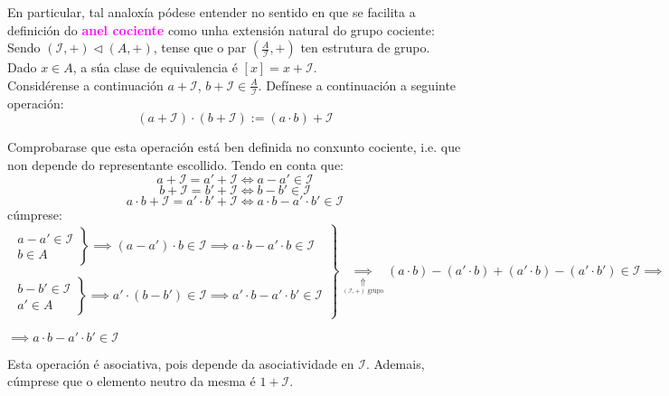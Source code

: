 \documentclass[twoside]{report}
\newcommand{\magbf}[1]{\textcolor{magenta}{\textbf{#1}}} %
\theoremstyle{mystyle}
\begin{document}
\noindent En particular, tal analoxía pódese entender no sentido en que se facilita a definición do \magbf{anel cociente} como unha extensión natural do grupo cociente:\\

\noindent Sendo $(\mathcal{I}, +) \triangleleft (A, +)$, tense que o par $\left (\displaystyle \frac{A}{\mathcal{I}}, + \right )$ ten estrutura de grupo. Dado $x \in A$, a súa clase de equivalencia é $[x] = x + \mathcal{I}$.\\

\noindent Considérense a continuación $a + \mathcal{I}$, $b + \mathcal{I} \in \displaystyle \frac{A}{\mathcal{I}}$. Defínese a continuación a seguinte operación:
$$(a + \mathcal{I}) \cdot (b + \mathcal{I}) := (a \cdot b) + \mathcal{I}$$

\noindent Comprobarase que esta operación está ben definida no conxunto cociente, i.e. que non depende do representante escollido. Tendo en conta que:
$$a + \mathcal{I} = a' + \mathcal{I} \Longleftrightarrow a - a' \in \mathcal{I}$$
$$b + \mathcal{I} = b' + \mathcal{I} \Longleftrightarrow b - b' \in \mathcal{I}$$
$$a \cdot b +\mathcal{I} = a' \cdot b' + \mathcal{I} \Longleftrightarrow a \cdot b - a' \cdot b' \in \mathcal{I}$$
\noindent cúmprese:
$$
\left. \begin{array}{r} 
\left. \begin{array}{r} 
a - a' \in \mathcal{I}\\[1ex]
b \in A
\end{array} \right\} 
\implies (a - a') \cdot b \in \mathcal{I} \implies a \cdot b - a' \cdot b \in \mathcal{I} \\
\\
\left. \begin{array}{r}
b - b' \in \mathcal{I}\\[1ex]
a' \in A
\end{array} \right\}
\implies a' \cdot (b - b') \in \mathcal{I} \implies a' \cdot b - a' \cdot b' \in \mathcal{I}
\end{array} \right\} 
\underset{\underset{(\mathcal{I},+) \text{ grupo}}{\Uparrow}}{\implies} (a \cdot b) - (a' \cdot b) + (a' \cdot b) - (a' \cdot b') \in \mathcal{I} \implies
$$
\begin{flushright}
$\implies a \cdot b - a' \cdot b' \in \mathcal{I}$\\
\end{flushright}

\noindent Esta operación é asociativa, pois depende da asociatividade en $\mathcal{I}$. Ademais, cúmprese que o elemento neutro da mesma é $1 + \mathcal{I}$.\\
\end{document}
